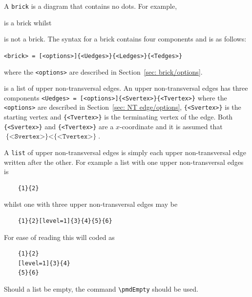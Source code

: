\documentclass{ltxdoc}
\begin{document}
A \texttt{brick} is a diagram that contains no dots. For example,
\begin{center}
\end{center}
is a brick whilst
\begin{center}
\end{center}
is not a brick.
The syntax for a brick contains four components and is as follows:
\begin{center}
    \texttt{<brick>~=~[<options>]\{<Uedges>\}\{<Ledges>\}\{<Tedges>\}}
\end{center}
where
the \texttt{<options>} are described in Section~\ref{sec: brick/options}.

is a list of upper non-transversal edges. An upper non-transversal edges has three components \texttt{<Uedges>~=~[<options>]\{<Svertex>\}\{<Tvertex>\}} where
the \texttt{<options>} are described in Section~\ref{sec: NT edge/options},
\texttt{\{<Svertex>\}} is the starting vertex and
\texttt{\{<Tvertex>\}} is the terminating vertex of the edge. Both \texttt{\{<Svertex>\}} and \texttt{\{<Tvertex>\}} are a \( x \)-coordinate and it is assumed that \( \texttt{\{<Svertex>\}} < \texttt{\{<Tvertex>\}} \).

A \texttt{list} of upper non-transversal edges is simply each upper non-transversal edge written after the other. For example a list with one upper non-transversal edges is
\begin{verbatim}
    {1}{2}
\end{verbatim}
whilst one with three upper non-transversal edges may be
\begin{verbatim}
    {1}{2}[level=1]{3}{4}{5}{6}
\end{verbatim}
For ease of reading this will coded as
\begin{verbatim}
    {1}{2}
    [level=1]{3}{4}
    {5}{6}
\end{verbatim}
\DescribeMacro{\pmdEmpty}
Should a list be empty, the command \verb`\pmdEmpty` should be used.
\end{document}
